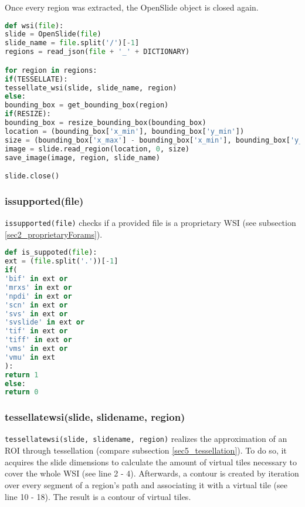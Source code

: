 Once every region was extracted, the OpenSlide object is closed again.

\begin{lstlisting}[frame=single,language=python]
def wsi(file):
slide = OpenSlide(file)
slide_name = file.split('/')[-1]
regions = read_json(file + '_' + DICTIONARY)

for region in regions:
if(TESSELLATE):
tessellate_wsi(slide, slide_name, region)
else:
bounding_box = get_bounding_box(region)
if(RESIZE):
bounding_box = resize_bounding_box(bounding_box)
location = (bounding_box['x_min'], bounding_box['y_min'])
size = (bounding_box['x_max'] - bounding_box['x_min'], bounding_box['y_max'] - bounding_box['y_min'])
image = slide.read_region(location, 0, size)
save_image(image, region, slide_name)

slide.close()
\end{lstlisting}
\clearpage


\subsubsection{is{\textunderscore}supported(file)}
\texttt{is{\textunderscore}supported(file)} checks if a provided file is a proprietary WSI (see subsection \ref{sec2_proprietaryForams}).
\begin{lstlisting}[frame=single,language=python]
def is_suppoted(file):
ext = (file.split('.'))[-1]
if(
'bif' in ext or
'mrxs' in ext or
'npdi' in ext or
'scn' in ext or
'svs' in ext or
'svslide' in ext or
'tif' in ext or
'tiff' in ext or
'vms' in ext or
'vmu' in ext
):
return 1
else:
return 0
\end{lstlisting}


\subsubsection{tessellate{\textunderscore}wsi(slide, slide{\textunderscore}name, region)}
\texttt{tessellate{\textunderscore}wsi(slide, slide{\textunderscore}name, region)} realizes the approximation of an ROI through tessellation (compare subsection \ref{sec5_tessellation}). To do so, it acquires the slide dimensions to calculate the amount of virtual tiles necessary to cover the whole WSI (see line 2 - 4). Afterwards, a contour is created by iteration over every segment of a region's path and associating it with a virtual tile (see line 10 - 18). The result is a contour of virtual tiles.

